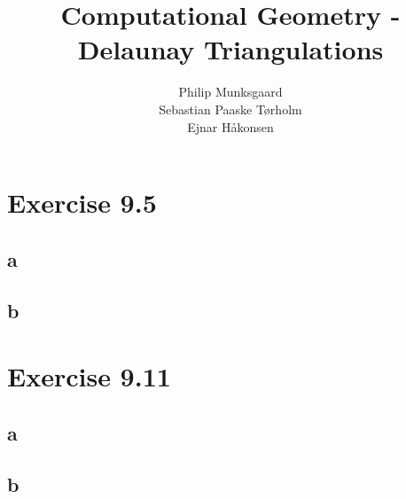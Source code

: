 \documentclass[11pt,a4paper]{article}
\title{Computational Geometry - Delaunay Triangulations}
\author{Philip Munksgaard \\ Sebastian Paaske Tørholm \\ Ejnar Håkonsen}
\begin{document}
\maketitle

\section{Exercise 9.5}
\subsection{a}

\subsection{b}

\section{Exercise 9.11}
\subsection{a}

\subsection{b}
\end{document}

